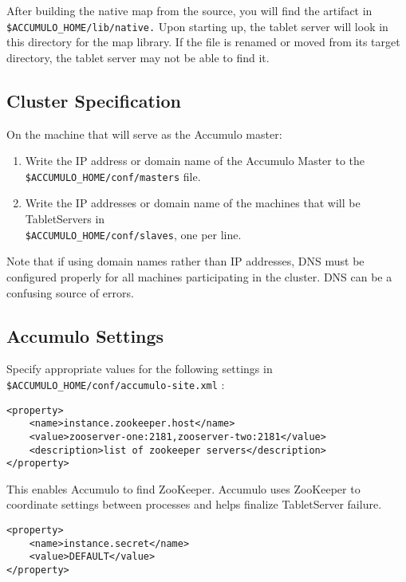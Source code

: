 After building the native map from the source, you will find the artifact in
\texttt{\$ACCUMULO\_HOME/lib/native.} Upon starting up, the tablet server will look
in this directory for the map library. If the file is renamed or moved from its
target directory, the tablet server may not be able to find it.

\subsection{Cluster Specification}

On the machine that will serve as the Accumulo master:

\begin{enumerate}
\item{Write the IP address or domain name of the Accumulo Master to the\\\texttt{\$ACCUMULO\_HOME/conf/masters} file.}
\item{Write the IP addresses or domain name of the machines that will be TabletServers in\\\texttt{\$ACCUMULO\_HOME/conf/slaves}, one per line.}
\end{enumerate}

Note that if using domain names rather than IP addresses, DNS must be configured
properly for all machines participating in the cluster. DNS can be a confusing source
of errors.

\subsection{Accumulo Settings}
Specify appropriate values for the following settings in\\
\texttt{\$ACCUMULO\_HOME/conf/accumulo-site.xml} :

\begingroup\fontsize{8pt}{8pt}\selectfont\begin{verbatim}
<property>
    <name>instance.zookeeper.host</name>
    <value>zooserver-one:2181,zooserver-two:2181</value>
    <description>list of zookeeper servers</description>
</property>
\end{verbatim}\endgroup

This enables Accumulo to find ZooKeeper. Accumulo uses ZooKeeper to coordinate
settings between processes and helps finalize TabletServer failure.


\begingroup\fontsize{8pt}{8pt}\selectfont\begin{verbatim}
<property>
    <name>instance.secret</name>
    <value>DEFAULT</value>
</property>
\end{verbatim}\endgroup

